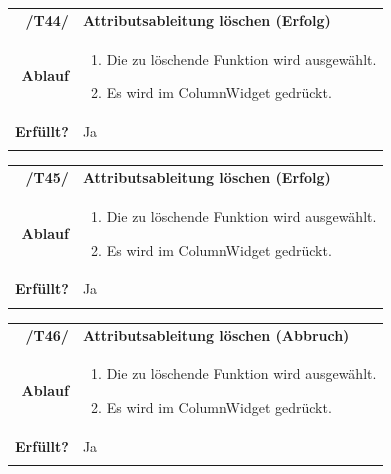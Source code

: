\documentclass{article}
\newcommand{\guibutton}[1]{\fbox{\texttt{#1}}}
\begin{document}
\begin{table}[H]
\begin{tabularx}{\textwidth}{rX}
\vspace{1mm}
\textbf{/T44/}         & \textbf{Attributsableitung löschen (Erfolg)} \\ \vspace{1mm}
\textbf{Ablauf} & 
\begin{enumerate}
        \item Die zu löschende Funktion wird ausgewählt.
        \item Es wird \guibutton{-} im ColumnWidget gedrückt.
    \end{enumerate} \\ \vspace{1mm}
\textbf{Erfüllt?}  & Ja  \\ \vspace{1mm}
\end{tabularx}
\end{table}

\begin{table}[H]
\begin{tabularx}{\textwidth}{rX}
\vspace{1mm}
\textbf{/T45/}         & \textbf{Attributsableitung löschen (Erfolg)} \\ \vspace{1mm}
\textbf{Ablauf} & 
\begin{enumerate}
        \item Die zu löschende Funktion wird ausgewählt.
        \item Es wird \guibutton{-} im ColumnWidget gedrückt.
    \end{enumerate} \\ \vspace{1mm}
\textbf{Erfüllt?}  & Ja  \\ \vspace{1mm}
\end{tabularx}
\end{table}

\begin{table}[H]
\begin{tabularx}{\textwidth}{rX}
\vspace{1mm}
\textbf{/T46/}         & \textbf{Attributsableitung löschen (Abbruch)} \\ \vspace{1mm}
\textbf{Ablauf} & 
\begin{enumerate}
        \item Die zu löschende Funktion wird ausgewählt.
        \item Es wird \guibutton{-} im ColumnWidget gedrückt.
    \end{enumerate} \\ \vspace{1mm}
\textbf{Erfüllt?}  & Ja  \\ \vspace{1mm}
\end{tabularx}
\end{table}
\end{document}
